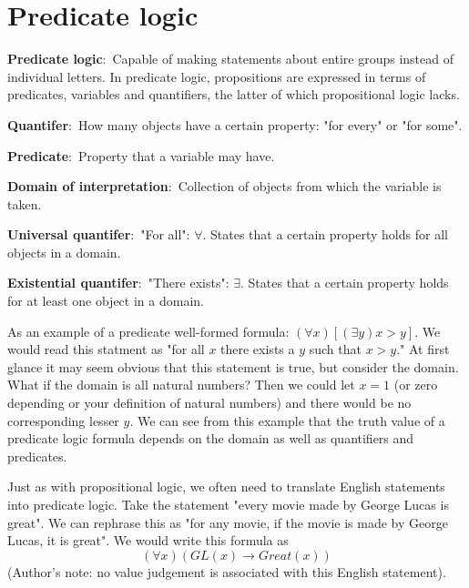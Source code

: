 \documentclass[nobib]{tufte-handout}
\newcommand{\defn}[2]{\noindent\textbf{#1}:\ #2}
\begin{document}
\pagebreak 

\section{Predicate logic}
\defn{Predicate logic}{Capable of making statements about entire 
groups instead of individual letters. In predicate logic, 
propositions are expressed in terms of predicates, 
variables and quantifiers}, the latter of which propositional logic lacks. 

\defn{Quantifer}{How many objects have a certain property: "for every" or "for some".}

\defn{Predicate}{Property that a variable may have.}

\defn{Domain of interpretation}{Collection of objects from which the variable is taken.}

\defn{Universal quantifer}{"For all": $\forall$}. States that a certain property holds
for all objects in a domain. 

\defn{Existential quantifer}{"There exists": $\exists$}. States that a certain property holds
for at least one object in a domain. 

As an example of a predicate well-formed formula: $(\forall x)[(\exists y) x > y]$. We would read this statment as 
"for all $x$ there exists a $y$ such that $x > y$." At first glance it may seem 
obvious that this statement is true, but consider the domain. What if the domain is 
all natural numbers? Then we could let $x=1$ (or zero depending
or your definition of natural numbers) and there would be no corresponding
lesser $y$. We can see from this example that the truth value of 
a predicate logic formula depends on the domain as well as quantifiers and predicates. 

Just as with propositional logic, we often need to translate English statements
into predicate logic. Take the statement "every movie made by George Lucas is great".
We can rephrase this as "for any movie, if the movie is made by George Lucas, it is great".
We would write this formula as
\[(\forall x)(GL(x) \rightarrow Great(x))\]
(Author's note: no value judgement is associated with this
English statement).
\end{document}
